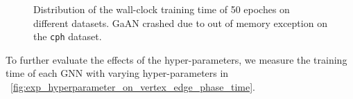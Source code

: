 \begin{figure}
    \caption{Distribution of the wall-clock training time of 50 epoches on different datasets. GaAN crashed due to out of memory exception on the \texttt{cph} dataset.}
    \label{fig:exp_absolute_training_time}
\end{figure}

To further evaluate the effects of the hyper-parameters, we measure the training time of each GNN with varying hyper-parameters in \figurename~\ref{fig:exp_hyperparameter_on_vertex_edge_phase_time}.

